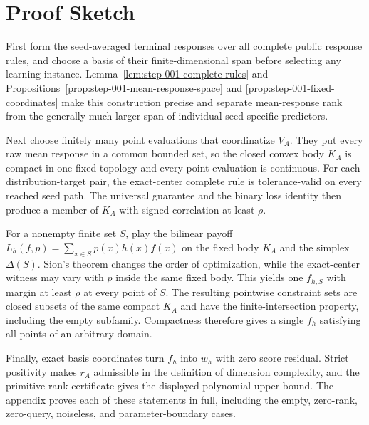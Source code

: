 \section{Proof Sketch}

First form the seed-averaged terminal responses over all complete public
response rules, and choose a basis of their finite-dimensional span before
selecting any learning instance.  Lemma~\ref{lem:step-001-complete-rules} and
Propositions~\ref{prop:step-001-mean-response-space} and
\ref{prop:step-001-fixed-coordinates} make this construction precise and
separate mean-response rank from the generally much larger span of individual
seed-specific predictors.

Next choose finitely many point evaluations that coordinatize \(V_A\).  They
put every raw mean response in a common bounded set, so the closed convex body
\(K_A\) is compact in one fixed topology and every point evaluation is
continuous.  For each distribution-target pair, the exact-center complete
rule is tolerance-valid on every reached seed path.  The universal guarantee
and the binary loss identity then produce a member of \(K_A\) with signed
correlation at least \(\rho\).

For a nonempty finite set \(S\), play the bilinear payoff
\(L_h(f,p)=\sum_{x\in S}p(x)h(x)f(x)\) on the fixed body \(K_A\) and the
simplex \(\Delta(S)\).  Sion's theorem changes the order of optimization,
while the exact-center witness may vary with \(p\) inside the same fixed body.
This yields one \(f_{h,S}\) with margin at least \(\rho\) at every point of
\(S\).  The resulting pointwise constraint sets are closed subsets of the
same compact \(K_A\) and have the finite-intersection property, including the
empty subfamily.  Compactness therefore gives a single \(f_h\) satisfying all
points of an arbitrary domain.

Finally, exact basis coordinates turn \(f_h\) into \(w_h\) with zero score
residual.  Strict positivity makes \(r_A\) admissible in the definition of
dimension complexity, and the primitive rank certificate gives the displayed
polynomial upper bound.  The appendix proves each of these statements in full,
including the empty, zero-rank, zero-query, noiseless, and parameter-boundary
cases.
